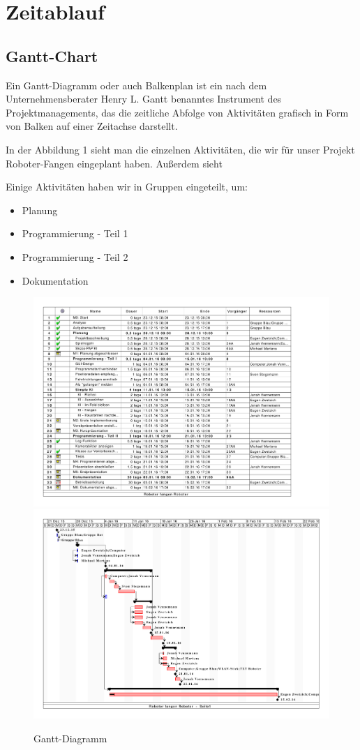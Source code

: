 \section{Zeitablauf}
\subsection{Gantt-Chart}
Ein Gantt-Diagramm oder auch Balkenplan ist ein nach dem Unternehmensberater Henry L. Gantt benanntes Instrument des Projektmanagements, das die zeitliche Abfolge von Aktivitäten grafisch in Form von Balken auf einer Zeitachse darstellt.

In der Abbildung 1 sieht man die einzelnen Aktivitäten, die wir für unser Projekt Roboter-Fangen eingeplant haben.
Außerdem sieht

Einige Aktivitäten haben wir in Gruppen eingeteilt, um:
\begin{itemize}
	\item Planung
	\item Programmierung - Teil 1
	\item Programmierung - Teil 2
	\item Dokumentation
\end{itemize}

\begin{center}
	\begin{figure}[H]
		\includegraphics[scale=0.5]{Bilder/GanttDiagramm_[Page1].pdf}
		\includegraphics[scale=0.5]{Bilder/GanttDiagramm_[Page2].pdf}
		\caption{Gantt-Diagramm}
	\end{figure}
\end{center}
